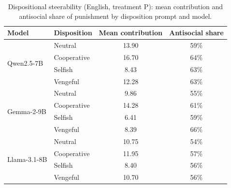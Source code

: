 \begin{table}[t]\centering
\caption{Dispositional steerability (English, treatment P): mean contribution and antisocial share of punishment by disposition prompt and model.}
\label{tab:si_personality}
\begin{tabular}{llcc}\toprule
Model & Disposition & Mean contribution & Antisocial share \\\midrule
\multirow{4}{*}{Qwen2.5-7B} & Neutral & 13.90 & 59\% \\
 & Cooperative & 16.70 & 64\% \\
 & Selfish & 8.43 & 63\% \\
 & Vengeful & 12.28 & 63\% \\
\midrule
\multirow{4}{*}{Gemma-2-9B} & Neutral & 9.86 & 55\% \\
 & Cooperative & 14.28 & 61\% \\
 & Selfish & 6.41 & 59\% \\
 & Vengeful & 8.39 & 66\% \\
\midrule
\multirow{4}{*}{Llama-3.1-8B} & Neutral & 10.75 & 54\% \\
 & Cooperative & 11.95 & 57\% \\
 & Selfish & 8.40 & 56\% \\
 & Vengeful & 10.70 & 56\% \\
\bottomrule\end{tabular}\end{table}
